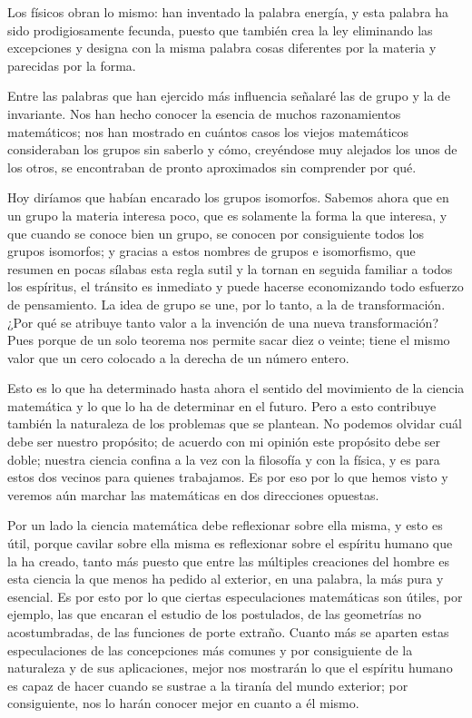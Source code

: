 \documentclass[a4paper, 12pt]{article}
\begin{document}
Los físicos obran lo mismo: han inventado la palabra energía, y
esta palabra ha sido prodigiosamente fecunda, puesto que también crea la
ley eliminando las excepciones y designa con la misma palabra cosas
diferentes por la materia y parecidas por la forma.

Entre las palabras que han ejercido más influencia señalaré las
de grupo y la de invariante. Nos han hecho conocer la esencia de muchos
razonamientos matemáticos; nos han mostrado en cuántos casos los
viejos matemáticos consideraban los grupos sin saberlo y cómo, creyéndose muy alejados los unos de los otros, se encontraban de pronto
aproximados sin comprender por qué.

Hoy diríamos que habían encarado los grupos isomorfos. Sabemos
ahora que en un grupo la materia interesa poco, que es solamente la forma la
que interesa, y que cuando se conoce bien un grupo, se conocen por
consiguiente todos los grupos isomorfos; y gracias a estos nombres de
grupos e isomorfismo, que resumen en pocas sílabas esta regla sutil y la tornan en
seguida familiar a todos los espíritus, el tránsito es inmediato y
puede hacerse economizando todo esfuerzo de pensamiento. La idea de grupo se
une, por lo tanto, a la de transformación. ¿Por qué se atribuye
tanto valor a la invención de una nueva transformación? Pues porque
de un solo teorema nos permite sacar diez o veinte; tiene el mismo valor
que un cero colocado a la derecha de un número entero.

Esto es lo que ha determinado hasta ahora el sentido del movimiento de la
ciencia matemática y lo que lo ha de determinar en el futuro. Pero a esto contribuye también la naturaleza de los problemas que se
plantean. No podemos olvidar cuál debe ser nuestro propósito; de
acuerdo con mi opinión este propósito debe ser doble; nuestra
ciencia confina a la vez con la filosofía y con la física, y es
para estos dos vecinos para quienes trabajamos. Es por eso por lo que hemos
visto y veremos aún marchar las matemáticas en dos direcciones
opuestas.

Por un lado la ciencia matemática debe reflexionar sobre ella misma, y
esto es útil, porque cavilar sobre ella misma es reflexionar sobre el espíritu humano que la ha creado, tanto más puesto que entre las múltiples creaciones del hombre es esta ciencia la que menos ha pedido al
exterior, en una palabra, la más pura y esencial. Es por esto por lo que
ciertas especulaciones matemáticas son útiles, por ejemplo, las que
encaran el estudio de los postulados, de las geometrías no
acostumbradas, de las funciones de porte extraño. Cuanto más se
aparten estas especulaciones de las concepciones más comunes y por
consiguiente de la naturaleza y de sus aplicaciones, mejor nos mostrarán
lo que el espíritu humano es capaz de hacer cuando se sustrae a la tiranía del mundo exterior; por consiguiente, nos lo harán conocer
mejor en cuanto a él mismo.
\end{document}
